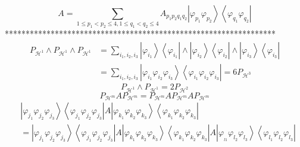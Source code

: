 \documentclass[aps,preprint]{revtex4}%
\begin{document}
\begin{equation}
A=\sum_{1\leq p_{1}<p_{2}\leq4,1\leq q_{1}<q_{2}\leq4}A_{p_{1}p_{2}q_{1}q_{2}%
}\left\vert \varphi_{p_{1}}\varphi_{p_{2}}\right\rangle \left\langle
\varphi_{q_{1}}\varphi_{q_{2}}\right\vert
\end{equation}
*****************************************************************%
\begin{align}
P_{\mathcal{H}^{1}}\wedge P_{\mathcal{H}^{1}}\wedge P_{\mathcal{H}^{1}} &
=\sum_{i_{1},i_{2},i_{3}}\left\vert \varphi_{i_{1}}\right\rangle \left\langle
\varphi_{i_{1}}\right\vert \wedge\left\vert \varphi_{i_{2}}\right\rangle
\left\langle \varphi_{i_{2}}\right\vert \wedge\left\vert \varphi_{i_{3}%
}\right\rangle \left\langle \varphi_{i_{3}}\right\vert \nonumber\\
&  =\sum_{i_{1},i_{2},i_{3}}\left\vert \varphi_{i_{1}}\varphi_{i_{2}}%
\varphi_{i_{3}}\right\rangle \left\langle \varphi_{i_{1}}\varphi_{i_{2}%
}\varphi_{i_{3}}\right\vert =6P_{\mathcal{H}^{3}}%
\end{align}%
\begin{equation}
P_{\mathcal{H}^{1}}\wedge P_{\mathcal{H}^{1}}=2P_{\mathcal{H}^{2}}%
\end{equation}%
\begin{equation}
P_{\mathcal{H}^{m}}AP_{\mathcal{H}^{m}}=P_{\mathcal{H}^{m}}AP_{\mathcal{H}%
^{m}}AP_{\mathcal{H}^{m}}%
\end{equation}%
\begin{align}
&  \left\vert \varphi_{j_{1}}\varphi_{j_{2}}\varphi_{j_{3}}\right\rangle
\left\langle \varphi_{j_{1}}\varphi_{j_{2}}\varphi_{j_{3}}\right\vert
A\left\vert \varphi_{k_{1}}\varphi_{k_{2}}\varphi_{k_{3}}\right\rangle
\left\langle \varphi_{k_{1}}\varphi_{k_{2}}\varphi_{k_{3}}\right\vert
\nonumber\\
&  =\left\vert \varphi_{j_{1}}\varphi_{j_{2}}\varphi_{j_{3}}\right\rangle
\left\langle \varphi_{j_{1}}\varphi_{j_{2}}\varphi_{j_{3}}\right\vert
A\left\vert \varphi_{k_{1}}\varphi_{k_{2}}\varphi_{k_{3}}\right\rangle
\left\langle \varphi_{k_{1}}\varphi_{k_{2}}\varphi_{k_{3}}\right\vert
A\left\vert \varphi_{_{l1}}\varphi_{l_{2}}\varphi_{l_{3}}\right\rangle
\left\langle \varphi_{l_{1}}\varphi_{l_{2}}\varphi_{l_{3}}\right\vert
\end{align}
%
\end{document}
